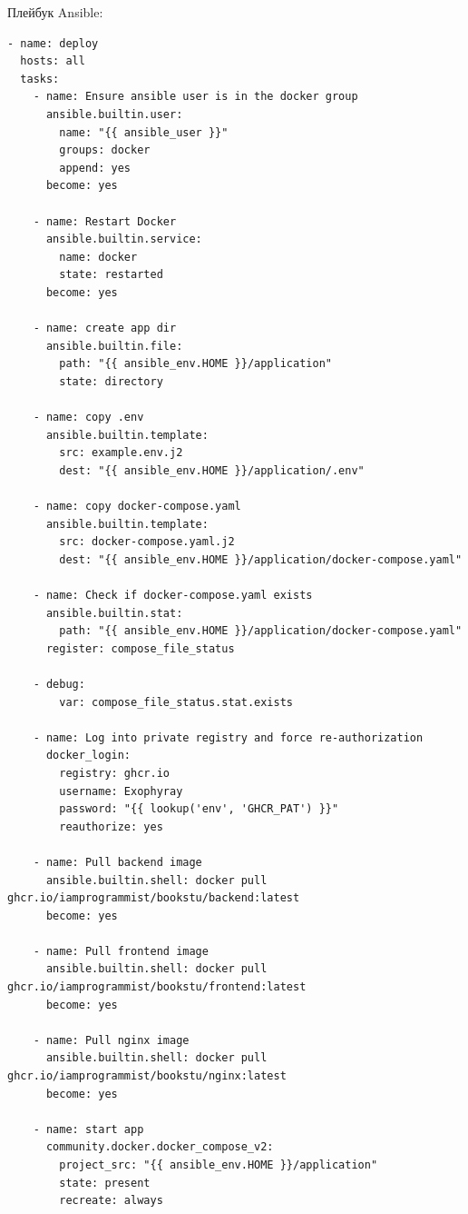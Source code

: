 \documentclass[a4paper,14pt]{extarticle}
\begin{document}
Плейбук Ansible:
\begin{verbatim}
- name: deploy
  hosts: all
  tasks:
    - name: Ensure ansible user is in the docker group
      ansible.builtin.user:
        name: "{{ ansible_user }}"
        groups: docker
        append: yes
      become: yes

    - name: Restart Docker
      ansible.builtin.service:
        name: docker
        state: restarted
      become: yes

    - name: create app dir
      ansible.builtin.file:
        path: "{{ ansible_env.HOME }}/application"
        state: directory

    - name: copy .env
      ansible.builtin.template:
        src: example.env.j2
        dest: "{{ ansible_env.HOME }}/application/.env"

    - name: copy docker-compose.yaml
      ansible.builtin.template:
        src: docker-compose.yaml.j2
        dest: "{{ ansible_env.HOME }}/application/docker-compose.yaml"

    - name: Check if docker-compose.yaml exists
      ansible.builtin.stat:
        path: "{{ ansible_env.HOME }}/application/docker-compose.yaml"
      register: compose_file_status

    - debug:
        var: compose_file_status.stat.exists
    
    - name: Log into private registry and force re-authorization
      docker_login:
        registry: ghcr.io
        username: Exophyray
        password: "{{ lookup('env', 'GHCR_PAT') }}"
        reauthorize: yes
    
    - name: Pull backend image
      ansible.builtin.shell: docker pull ghcr.io/iamprogrammist/bookstu/backend:latest
      become: yes

    - name: Pull frontend image
      ansible.builtin.shell: docker pull ghcr.io/iamprogrammist/bookstu/frontend:latest
      become: yes

    - name: Pull nginx image
      ansible.builtin.shell: docker pull ghcr.io/iamprogrammist/bookstu/nginx:latest
      become: yes

    - name: start app
      community.docker.docker_compose_v2:
        project_src: "{{ ansible_env.HOME }}/application"
        state: present
        recreate: always
\end{verbatim}
\end{document}
